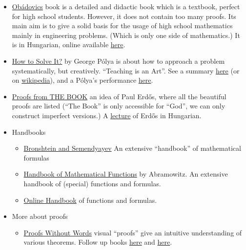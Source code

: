 \documentclass{article}
\begin{document}
\begin{itemize}
    \item \href{https://moly.hu/konyvek/obadovics-j-gyula-matematika}{Obádovics} book is a detailed and didactic book which is a textbook, perfect for high school students. However, it does not contain too many proofs. Its main aim is to give a solid basis for the usage of high school mathematics mainly in engineering problems. (Which is only one side of mathematics.) It is in Hungarian, online available \href{https://www.scribd.com/document/351926211/Obadovics-J-Gyula-Matematika-pdf}{here}.

    \item \href{https://www.goodreads.com/book/show/192221.How_to_Solve_It}{How to Solve It?} by George Pólya is about how to approach a problem systematically, but creatively. ``Teaching is an Art''. See a summary \href{https://math.berkeley.edu/~gmelvin/polya.pdf}{here} (or on \href{https://en.wikipedia.org/wiki/How_to_Solve_It}{wikipedia}), and a Pólya's performance \href{https://www.youtube.com/watch?v=h0gbw-Ur_do}{here}.
    
    \item \href{https://www.goodreads.com/book/show/696238.Proofs_from_THE_BOOK}{Proofs from THE BOOK} an idea of Paul Erdős, where all the beautiful proofs are listed (``The Book'' is only accessible for ``God'', we can only construct imperfect versions.) A \href{https://www.youtube.com/watch?v=-oxfHwSzoM4}{lecture} of Erdős in Hungarian.
    
    \item Handbooks
    \begin{itemize}

        \item \href{https://www.goodreads.com/book/show/1904487.Handbook_of_Mathematics}{Bronshtein and Semendyayev} An extensive ``handbook'' of mathematical formulas
    
        \item \href{https://www.goodreads.com/book/show/1296073.Handbook_of_Mathematical_Functions}{Handbook of Mathematical Functions} by Abramowitz. An extensive handbook of (special) functions and formulas.
    
        \item \href{https://dlmf.nist.gov/}{Online Handbook} of functions and formulas.
    \end{itemize}
    
    \item More about proofs
    \begin{itemize}
        \item \href{https://www.goodreads.com/book/show/365666.Proofs_Without_Words}{Proofs Without Words} visual ``proofs'' give an intuitive understanding of various theorems. Follow up books \href{https://www.goodreads.com/book/show/365667.Proofs_Without_Words_II}{here} and \href{https://www.goodreads.com/book/show/9655655-charming-proofs}{here}.
    

\end{itemize}
\end{itemize}
\end{document}
